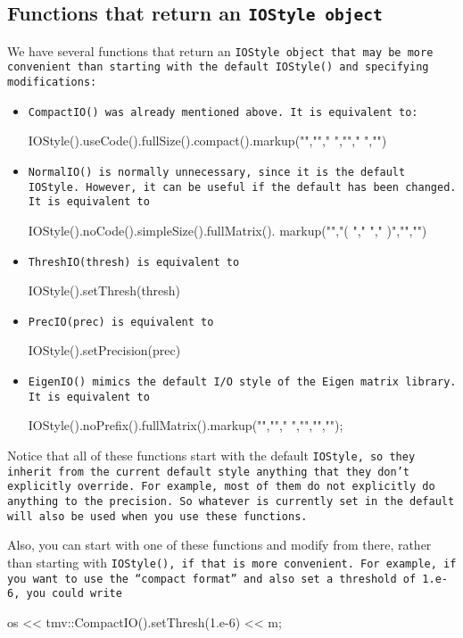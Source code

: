 \subsection[Functions that return an IOStyle object]{Functions that return an \tt{IOStyle} object}

We have several functions that return an \tt{IOStyle} object that may be more convenient than starting with the default \tt{IOStyle()} and specifying modifications:
 
\begin{itemize}
\item \tt{CompactIO()} was already mentioned above.  It is equivalent to:
\begin{tmvcode}
IOStyle().useCode().fullSize().compact().markup("",""," ",""," ","")
\end{tmvcode}

\item \tt{NormalIO()} is normally unnecessary, since it is the default \tt{IOStyle}.  However, it can be useful if the default has been changed.  It is equivalent to
\begin{tmvcode}
IOStyle().noCode().simpleSize().fullMatrix().
      markup("\n","( ","  "," )","\n","\n")
\end{tmvcode}

\item
\tt{ThreshIO(thresh)} is equivalent to
\begin{tmvcode}
IOStyle().setThresh(thresh)
\end{tmvcode}

\item
\tt{PrecIO(prec)} is equivalent to
\begin{tmvcode}
IOStyle().setPrecision(prec)
\end{tmvcode}

\item
\tt{EigenIO()} mimics the default I/O style of the Eigen matrix library.  It is equivalent to
\begin{tmvcode}
IOStyle().noPrefix().fullMatrix().markup("",""," ","","\n","");
\end{tmvcode}

\end{itemize}

Notice that all of these functions start with the default \tt{IOStyle}, so they inherit from the current default style anything that they don't explicitly override.  For example, most of them do not explicitly do anything to the precision.  So whatever is currently set in the default will also be used when you use these functions.

Also, you can start with one of these functions and modify from there, rather than starting with \tt{IOStyle()}, if that is more convenient.  For example, if you want to use the ``compact format'' and also set a threshold of \tt{1.e-6}, you could write
\begin{tmvcode}
os << tmv::CompactIO().setThresh(1.e-6) << m;
\end{tmvcode}

